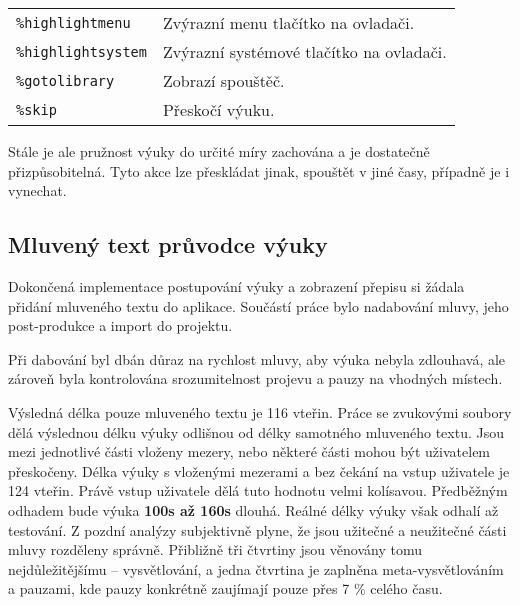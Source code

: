\begin{longtable}[]{@{}ll@{}}
\begin{minipage}[t]{0.05\columnwidth}
\texttt{\%highlightmenu}\strut
\end{minipage} & \begin{minipage}[t]{0.05\columnwidth}\raggedright\strut
Zvýrazní menu tlačítko na ovladači.\strut
\end{minipage}\tabularnewline
\begin{minipage}[t]{0.05\columnwidth}\raggedright\strut
\texttt{\%highlightsystem}\strut
\end{minipage} & \begin{minipage}[t]{0.05\columnwidth}\raggedright\strut
Zvýrazní systémové tlačítko na ovladači.\strut
\end{minipage}\tabularnewline
\begin{minipage}[t]{0.05\columnwidth}\raggedright\strut
\texttt{\%gotolibrary}\strut
\end{minipage} & \begin{minipage}[t]{0.05\columnwidth}\raggedright\strut
Zobrazí spouštěč.\strut
\end{minipage}\tabularnewline
\begin{minipage}[t]{0.05\columnwidth}\raggedright\strut
\texttt{\%skip}\strut
\end{minipage} & \begin{minipage}[t]{0.05\columnwidth}\raggedright\strut
Přeskočí výuku.\strut
\end{minipage}\tabularnewline
\bottomrule
\end{longtable}

Stále je ale pružnost výuky do určité míry zachována a je dostatečně
přizpůsobitelná. Tyto akce lze přeskládat jinak, spouštět v jiné časy,
případně je i vynechat.

\subsection{Mluvený text průvodce
výuky}\label{mluvenuxfd-text-prux16fvodce-vuxfduky}

Dokončená implementace postupování výuky a zobrazení přepisu si žádala
přidání mluveného textu do aplikace. Součástí práce bylo nadabování
mluvy, jeho post-produkce a import do projektu.

Při dabování byl dbán důraz na rychlost mluvy, aby výuka nebyla
zdlouhavá, ale zároveň byla kontrolována srozumitelnost projevu a pauzy
na vhodných místech.

Výsledná délka pouze mluveného textu je 116 vteřin. Práce se zvukovými
soubory dělá výslednou délku výuky odlišnou od délky samotného mluveného
textu. Jsou mezi jednotlivé části vloženy mezery, nebo některé části
mohou být uživatelem přeskočeny. Délka výuky s vloženými mezerami a bez
čekání na vstup uživatele je 124 vteřin. Právě vstup uživatele dělá tuto
hodnotu velmi kolísavou. Předběžným odhadem bude výuka \textbf{100s až
160s} dlouhá. Reálné délky výuky však odhalí až testování.
Z pozdní analýzy subjektivně plyne, že jsou užitečné a neužitečné
části mluvy rozděleny správně. Přibližně tři čtvrtiny jsou věnovány
tomu nejdůležitějšímu -- vysvětlování, a jedna čtvrtina je zaplněna
meta-vysvětlováním a pauzami, kde pauzy konkrétně zaujímají pouze přes 7
\% celého času.

